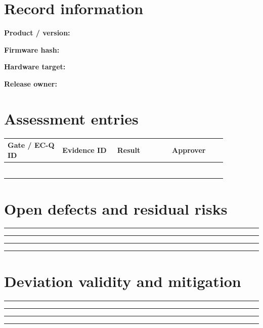 \documentclass[10pt,letterpaper]{article}
\begin{document}
\makedoctitle
\makedocsummary
\section{Record information}
\noindent\textbf{Product / version:}\quad\hrulefill\par\vspace{11pt}
\noindent\textbf{Firmware hash:}\quad\hrulefill\par\vspace{11pt}
\noindent\textbf{Hardware target:}\quad\hrulefill\par\vspace{11pt}
\noindent\textbf{Release owner:}\quad\hrulefill\par\vspace{11pt}
\section{Assessment entries}
\begin{longtable}{|p{0.215\linewidth}|p{0.215\linewidth}|p{0.215\linewidth}|p{0.215\linewidth}|}
\hline
\textbf{Gate / EC-Q ID} & \textbf{Evidence ID} & \textbf{Result} & \textbf{Approver}\\\hline
\endhead
\rule{0pt}{27pt} & & & \\\hline
\rule{0pt}{27pt} & & & \\\hline
\rule{0pt}{27pt} & & & \\\hline
\rule{0pt}{27pt} & & & \\\hline
\rule{0pt}{27pt} & & & \\\hline
\rule{0pt}{27pt} & & & \\\hline
\end{longtable}
\section{Open defects and residual risks}
\noindent\rule{\linewidth}{0.4pt}\par\vspace{16pt}
\noindent\rule{\linewidth}{0.4pt}\par\vspace{16pt}
\noindent\rule{\linewidth}{0.4pt}\par\vspace{16pt}
\noindent\rule{\linewidth}{0.4pt}\par\vspace{16pt}
\section{Deviation validity and mitigation}
\noindent\rule{\linewidth}{0.4pt}\par\vspace{16pt}
\noindent\rule{\linewidth}{0.4pt}\par\vspace{16pt}
\noindent\rule{\linewidth}{0.4pt}\par\vspace{16pt}
\noindent\rule{\linewidth}{0.4pt}\par\vspace{16pt}
\end{document}
